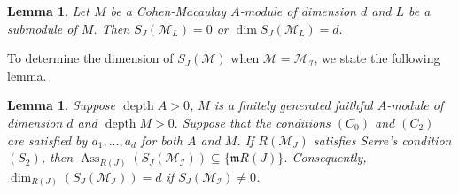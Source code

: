 \documentclass[11pt,reqno]{amsart}
\newtheorem{lemma}[theorem]{Lemma}
\theoremstyle{definition}
\newcommand{\m}{\mathfrak m}
\def\M{{\mathcal M}}
\def\I{{\mathcal I}}
\DeclareMathOperator{\depth}{depth}
\DeclareMathOperator{\ass}{Ass}
\numberwithin{equation}{section}
\begin{document}
\begin{lemma}\cite[Corollary 6.2]{rossi-valla}\label{lemma-2.3(a)}
    Let $M$ be a Cohen-Macaulay $A$-module of dimension $d$ and $L$ be a submodule of $M$. Then $S_J(\M_L)=0$ or $\dim S_J(\M_L)=d.$ 
    
    
\end{lemma}
To determine the dimension of $S_J(\M)$ when $\M=\M_{\I}$, we state the following lemma. 
 \begin{lemma}\label{lemma-2.3(b)} Suppose $\depth A>0$, $M$ is a finitely generated faithful $A$-module of dimension $d$ and $\depth M>0.$ Suppose that the conditions $(C_0)$ and $(C_2)$  are satisfied by $a_1,\ldots,a_d$ for both $A$ and $M$.  If $R(\M_J)$ satisfies Serre's condition $(S_2)$, then $\ass_{R(J)}(S_J(\M_\I))\subseteq \{\m R(J)\}$. Consequently, $\dim_{R(J)}(S_J(\M_\I))=d$ if $S_J(\M_\I)\neq 0$.
 \end{lemma}
\end{document}
